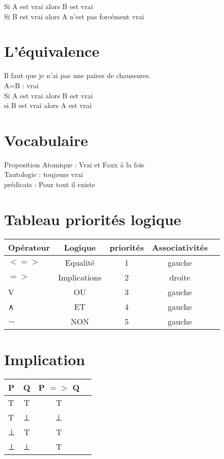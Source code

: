 Si A est vrai alors B est vrai \\

Si B est vrai alors A n'est pas forcément vrai \\

\newpage
\section{L'équivalence}
\vspace{5mm} %

Il faut que je n'ai pas une paires de chaussures. \\

A=B : vrai \\

Si A est vrai alors B est vrai \\

si B est vrai alors A est vrai \\

\section{Vocabulaire}
\vspace{5mm} %

Proposition Atomique : Vrai et Faux à la fois \\

Tautologie : toujours vrai \\

prédicats :  Pour tout il existe

\vspace{4mm}
\section{Tableau priorités logique}
\begin{tabular}{|l|c|c|c|c|}
  \hline
  Opérateur & Logique & priorités & Associativités \\
  \hline
  $<=>$ & Equalité & 1 & gauche \\
  $=>$ & Implications & 2 & droite \\
  V & OU & 3 & gauche \\
  ∧ & ET & 4 & gauche \\
  ¬ & NON & 5 & gauche \\
  \hline
\end{tabular}

\vspace{4mm}
\section{Implication}
\begin{tabular}{|l|c|c|c|}
  \hline
  P & Q & P $=>$ Q \\
  \hline
  T & T & T \\
  T & ⊥ & ⊥ \\
  ⊥ & T & T \\
  ⊥ & ⊥ & T \\
  \hline
\end{tabular}

